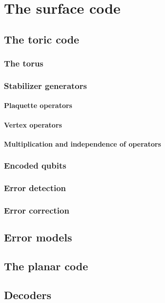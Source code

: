 
\chapter{The surface code}

\section{The toric code}
\subsection{The torus}
\subsection{Stabilizer generators}
\subsubsection{Plaquette operators}
\subsubsection{Vertex operators}
\subsubsection{Multiplication and independence of operators}
\subsection{Encoded qubits}
\subsection{Error detection}
\subsection{Error correction}

\section{Error models}

\section{The planar code}

\section{Decoders}
